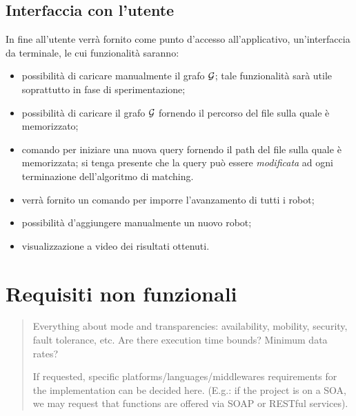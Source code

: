\documentclass{llncs}
\begin{document}
\subsection{Interfaccia con l'utente}
In fine all'utente verrà fornito come punto d'accesso all'applicativo,
un'interfaccia da terminale, le cui funzionalità saranno:
\begin{itemize}
	\item possibilità di caricare manualmente il grafo $\mathcal{G}$; tale
	funzionalità sarà utile soprattutto in fase di sperimentazione;
	\item possibilità di caricare il grafo $\mathcal{G}$ fornendo il percorso
	del file sulla quale è memorizzato;
	\item comando per iniziare una nuova query fornendo il path del
	file sulla quale è memorizzata; si tenga presente che la query
	può essere \emph{modificata} ad ogni terminazione dell'algoritmo di 
	matching. 
	
	\item verrà fornito un comando per imporre l'avanzamento di tutti
	i robot;
	\item possibilità d'aggiungere manualmente un nuovo robot;
	\item visualizzazione a video dei risultati ottenuti.
\end{itemize}



\section{Requisiti non funzionali}
\label{sec:nonfunc-req}
\begin{quote}
  Everything about mode and transparencies:
  availability, mobility, security, fault tolerance, etc.
  Are there execution time bounds? Minimum data rates?

  If requested, specific platforms/languages/middlewares requirements
  for the implementation can be decided here.
  (E.g.: if the project is on a SOA, we may request that functions
  are offered via SOAP or RESTful services).
\end{quote}
\end{document}
